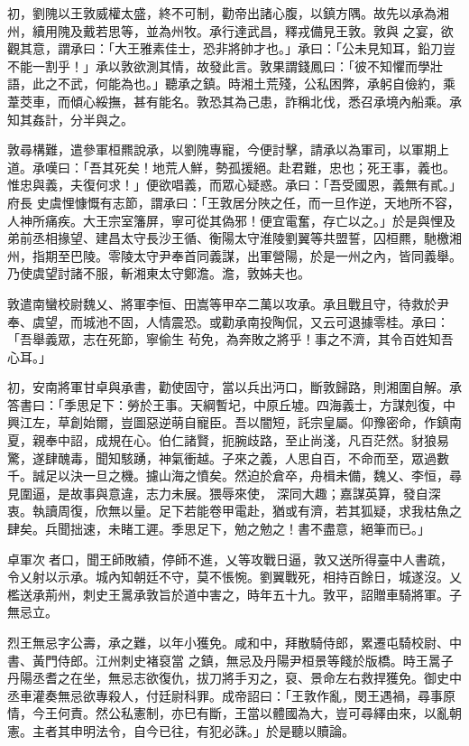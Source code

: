 \begin{pinyinscope}
 初，劉隗以王敦威權太盛，終不可制，勸帝出諸心腹，以鎮方隅。故先以承為湘州，續用隗及戴若思等，並為州牧。承行達武昌，釋戎備見王敦。敦與
 之宴，欲觀其意，謂承曰：「大王雅素佳士，恐非將帥才也。」承曰：「公未見知耳，鉛刀豈不能一割乎！」承以敦欲測其情，故發此言。敦果謂錢鳳曰：「彼不知懼而學壯語，此之不武，何能為也。」聽承之鎮。時湘土荒殘，公私困弊，承躬自儉約，乘葦茭車，而傾心綏撫，甚有能名。敦恐其為己患，詐稱北伐，悉召承境內船乘。承知其姦計，分半與之。



 敦尋構難，遣參軍桓羆說承，以劉隗專寵，今便討擊，請承以為軍司，以軍期上道。承嘆曰：「吾其死矣！地荒人鮮，勢孤援絕。赴君難，忠也；死王事，義也。惟忠與義，夫復何求！」便欲唱義，而眾心疑惑。承曰：「吾受國恩，義無有貳。」府長
 史虞悝慷慨有志節，謂承曰：「王敦居分陜之任，而一旦作逆，天地所不容，人神所痛疾。大王宗室籓屏，寧可從其偽邪！便宜電奮，存亡以之。」於是與悝及弟前丞相掾望、建昌太守長沙王循、衡陽太守淮陵劉翼等共盟誓，囚桓羆，馳檄湘州，指期至巴陵。零陵太守尹奉首同義謀，出軍營陽，於是一州之內，皆同義舉。乃使虞望討諸不服，斬湘東太守鄭澹。澹，敦姊夫也。



 敦遣南蠻校尉魏乂、將軍李恒、田嵩等甲卒二萬以攻承。承且戰且守，待救於尹奉、虞望，而城池不固，人情震恐。或勸承南投陶侃，又云可退據零桂。承曰：「吾舉義眾，志在死節，寧偷生
 茍免，為奔敗之將乎！事之不濟，其令百姓知吾心耳。」



 初，安南將軍甘卓與承書，勸使固守，當以兵出沔口，斷敦歸路，則湘圍自解。承答書曰：「季思足下：勞於王事。天綱暫圮，中原丘墟。四海義士，方謀剋復，中興江左，草創始爾，豈圖惡逆萌自寵臣。吾以闇短，託宗皇屬。仰豫密命，作鎮南夏，親奉中詔，成規在心。伯仁諸賢，扼腕歧路，至止尚淺，凡百茫然。豺狼易驚，遂肆醜毒，聞知駭踴，神氣衝越。子來之義，人思自百，不命而至，眾過數千。誠足以決一旦之機。攄山海之憤矣。然迫於倉卒，舟楫未備，魏乂、李恒，尋見圍逼，是故事與意違，志力未展。猥辱來使，
 深同大趣；嘉謀英算，發自深衷。執讀周復，欣無以量。足下若能卷甲電赴，猶或有濟，若其狐疑，求我枯魚之肆矣。兵聞拙速，未睹工遲。季思足下，勉之勉之！書不盡意，絕筆而已。」



 卓軍次者口，聞王師敗績，停師不進，乂等攻戰日逼，敦又送所得臺中人書疏，令乂射以示承。城內知朝廷不守，莫不悵惋。劉翼戰死，相持百餘日，城遂沒。乂檻送承荊州，刺史王暠承敦旨於道中害之，時年五十九。敦平，詔贈車騎將軍。子無忌立。



 烈王無忌字公壽，承之難，以年小獲免。咸和中，拜散騎侍郎，累遷屯騎校尉、中書、黃門侍郎。江州刺史褚裒當
 之鎮，無忌及丹陽尹桓景等餞於版橋。時王暠子丹陽丞耆之在坐，無忌志欲復仇，拔刀將手刃之，裒、景命左右救捍獲免。御史中丞車灌奏無忌欲專殺人，付廷尉科罪。成帝詔曰：「王敦作亂，閔王遇禍，尋事原情，今王何責。然公私憲制，亦巳有斷，王當以體國為大，豈可尋繹由來，以亂朝憲。主者其申明法令，自今已往，有犯必誅。」於是聽以贖論。




\end{pinyinscope}
